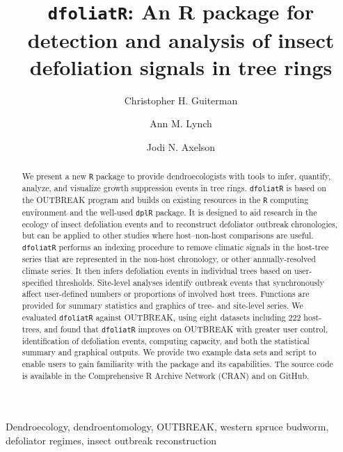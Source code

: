 \documentclass[review]{elsarticle} %
\begin{document}
\begin{frontmatter}

  \title{\texttt{dfoliatR}: An R package for detection and analysis of insect defoliation signals in tree rings}
    \author[a,b]{Christopher H. Guiterman}
    \author[a,c]{Ann M. Lynch}
    \author[d]{Jodi N. Axelson}
      \address[a]{Laboratory of Tree-Ring Research, University of Arizona, 1215 E Lowell St.~Box 210045, Tucson, AZ, 85721}
    \address[b]{Three Pines Forest Research, LLC, PO Box 225, Etna, NH, 03750}
    \address[c]{U.S. Forest Service, Rocky Mountain Research Station, 1215 E Lowell St.~Box 210045, Tucson, AZ, 85721}
    \address[d]{Dept of Environmental Science, Policy \& Management, University of California, Berkeley, 130 Mulford Hall \#3114, Berkeley, CA 94720}
  
  \begin{abstract}
  We present a new \texttt{R} package to provide dendroecologists with tools to infer, quantify, analyze, and visualize growth suppression events in tree rings. \texttt{dfoliatR} is based on the OUTBREAK program and builds on existing resources in the \texttt{R} computing environment and the well-used \texttt{dplR} package. It is designed to aid research in the ecology of insect defoliation events and to reconstruct defoliator outbreak chronologies, but can be applied to other studies where host--non-host comparisons are useful. \texttt{dfoliatR} performs an indexing procedure to remove climatic signals in the host-tree series that are represented in the non-host chronology, or other annually-resolved climate series. It then infers defoliation events in individual trees based on user-specified thresholds. Site-level analyses identify outbreak events that synchronously affect user-defined numbers or proportions of involved host trees. Functions are provided for summary statistics and graphics of tree- and site-level series. We evaluated \texttt{dfoliatR} against OUTBREAK, using eight datasets including 222 host-trees, and found that \texttt{dfoliatR} improves on OUTBREAK with greater user control, identification of defoliation events, computing capacity, and both the statistical summary and graphical outputs. We provide two example data sets and script to enable users to gain familiarity with the package and its capabilities. The source code is available in the Comprehensive R Archive Network (CRAN) and on GitHub.
  \end{abstract}
   \begin{keyword} Dendroecology, dendroentomology, OUTBREAK, western spruce budworm, defoliator regimes, insect outbreak reconstruction\end{keyword}
 \end{frontmatter}
\end{document}
